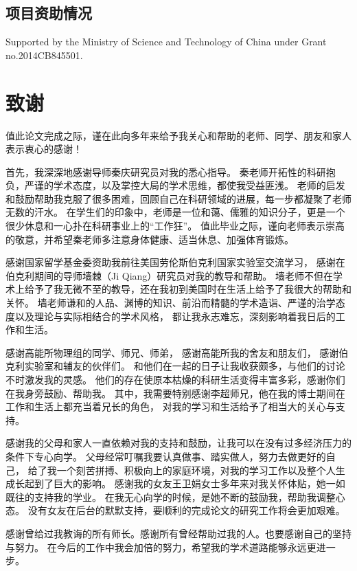 \section*{项目资助情况}

Supported by the Ministry of Science and Technology of China under Grant no.2014CB845501.
\chapter{致\quad 谢}

值此论文完成之际，谨在此向多年来给予我关心和帮助的老师、同学、朋友和家人表示衷心的感谢！

首先，我深深地感谢导师秦庆研究员对我的悉心指导。
秦老师开拓性的科研抱负，严谨的学术态度，以及掌控大局的学术思维，都使我受益匪浅。
老师的启发和鼓励帮助我克服了很多困难，回顾自己在科研领域的进展，每一步都凝聚了老师无数的汗水。
在学生们的印象中，老师是一位和蔼、儒雅的知识分子，更是一个很少休息和一心扑在科研事业上的“工作狂”。
值此毕业之际，谨向老师表示崇高的敬意，并希望秦老师多注意身体健康、适当休息、加强体育锻炼。

感谢国家留学基金委资助我前往美国劳伦斯伯克利国家实验室交流学习，
感谢在伯克利期间的导师墙棘（Ji Qiang）研究员对我的教导和帮助。
墙老师不但在学术上给予了我无微不至的教导，还在我初到美国时在生活上给予了我很大的帮助和关怀。
墙老师谦和的人品、渊博的知识、前沿而精髓的学术造诣、严谨的治学态度以及理论与实际相结合的学术风格，
都让我永志难忘，深刻影响着我日后的工作和生活。

感谢高能所物理组的同学、师兄、师弟，
感谢高能所我的舍友和朋友们，
感谢伯克利实验室和辅友的伙伴们。
和他们在一起的日子让我收获颇多，与他们的讨论不时激发我的灵感。
他们的存在使原本枯燥的科研生活变得丰富多彩，感谢你们在我身旁鼓励、帮助我。
其中，我需要特别感谢李超师兄，他在我的博士期间在工作和生活上都充当着兄长的角色，
对我的学习和生活给予了相当大的关心与支持。

感谢我的父母和家人一直依赖对我的支持和鼓励，让我可以在没有过多经济压力的条件下专心向学。
父母经常叮嘱我要认真做事、踏实做人，努力去做更好的自己，
给了我一个刻苦拼搏、积极向上的家庭环境，对我的学习工作以及整个人生成长起到了巨大的影响。
感谢我的女友王卫娟女士多年来对我关怀体贴，她一如既往的支持我的学业。
在我无心向学的时候，是她不断的鼓励我，帮助我调整心态。
没有女友在后台的默默支持，要顺利的完成论文的研究工作将会更加艰难。

感谢曾给过我教诲的所有师长。感谢所有曾经帮助过我的人。也要感谢自己的坚持与努力。
在今后的工作中我会加倍的努力，希望我的学术道路能够永远更进一步。

